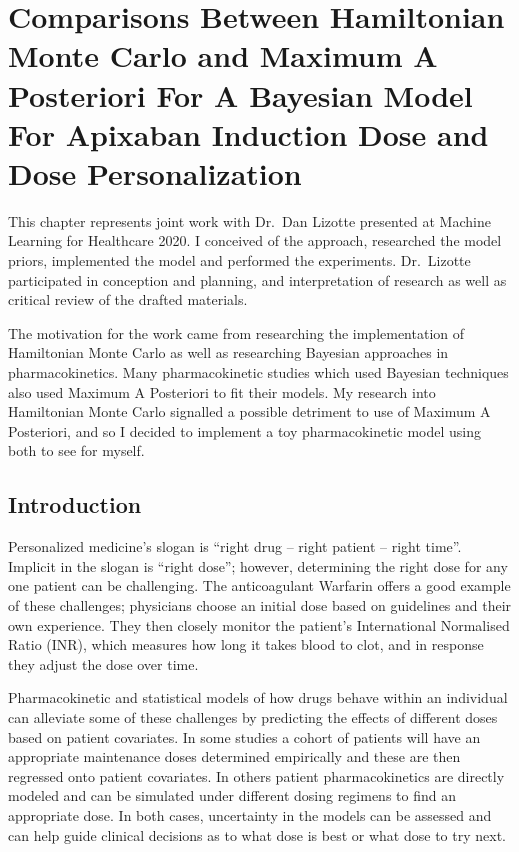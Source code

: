 \chapter[Comparisons Between HMC and MAP for Dose Personalization]{Comparisons Between Hamiltonian Monte Carlo and Maximum A Posteriori For A Bayesian Model For Apixaban Induction Dose and Dose Personalization}

This chapter represents joint work with Dr.\ Dan Lizotte presented at  Machine Learning for Healthcare 2020.  I conceived of the approach, researched the model priors, implemented the model and performed the experiments. Dr.\ Lizotte participated in conception and planning, and interpretation of research as well as critical review of the drafted materials.

The motivation for the work came from researching the implementation of Hamiltonian Monte Carlo as well as researching Bayesian approaches in pharmacokinetics.  Many pharmacokinetic studies which used Bayesian techniques also used Maximum A Posteriori to fit their models.  My research into Hamiltonian Monte Carlo signalled a possible detriment to use of Maximum A Posteriori, and so I decided to implement a toy pharmacokinetic model using both to see for myself.



\newpage


\section{Introduction}

Personalized medicine’s slogan is ``right drug -- right patient -- right time''.  Implicit in the slogan is ``right dose''; however, determining the right dose for any one patient can be challenging. The anticoagulant Warfarin offers a good example of these challenges; physicians choose an initial dose based on guidelines and their own experience. They then closely monitor the patient’s International Normalised Ratio (INR), which measures how long it takes blood to clot, and in response they adjust the dose over time.

Pharmacokinetic and statistical models of how drugs behave within an individual can alleviate some of these challenges by predicting the effects of different doses based on patient covariates. In some studies \cite{schwarz2008genetic,Sohrabi2017-zv, Caldwell2007-mi}  a cohort of patients will have an appropriate maintenance doses determined empirically and these are then regressed onto patient covariates.  In others \cite{ohara2019differences,Zhu2017-rk, Xue2017-mp}  patient pharmacokinetics are directly modeled and can be simulated under different dosing regimens to find an appropriate dose.  In both cases, uncertainty in the models can be assessed and can help guide clinical decisions as to what dose is best or what dose to try next.

